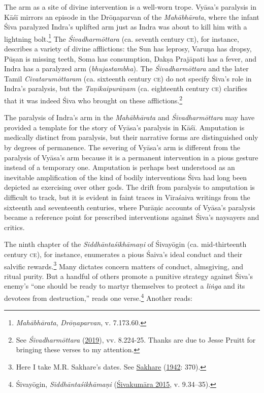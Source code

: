 The arm as a site of divine intervention is a well-worn trope. Vyāsa’s paralysis in Kāśī mirrors an episode in the Drōṇaparvan of the \emph{Mahābhārata}, where the infant Śiva paralyzed Indra’s uplifted arm just as Indra was about to kill him with a lightning bolt.\footnote{%
\emph{Mahābhārata}, \emph{Drōṇaparvan}, v. 7.173.60.
}
 The \emph{{Śivadharmōttara}} (ca. seventh century \textsc{ce}), for instance, describes a variety of divine afflictions: the Sun has leprosy, Varuṇa has dropsy, Pūṣan is missing teeth, Soma has consumption, Dakṣa Prajāpati has a fever, and Indra has a paralyzed arm (\emph{bhujastambha}). The \emph{{Śivadharmōttara}} and the later Tamil \emph{{Civatarumōttaram}} (ca. sixteenth century \textsc{ce}) do not specify Śiva’s role in Indra’s paralysis, but the \emph{{Taṇikaipurāṇam}} (ca. eighteenth century \textsc{ce}) clarifies that it was indeed Śiva who brought on these afflictions.\footnote{%
See \emph{{Śivadharmōttara}} (\hyperref[Sivadharmottara]{2019}), vv. 8.224-25. Thanks are due to Jesse Pruitt for bringing these verses to my attention.
}



The paralysis of Indra’s arm in the \emph{Mahābhārata} and \emph{{Śivadharmōttara}} may have provided a template for the story of Vyāsa’s paralysis in Kāśī. Amputation is medically distinct from paralysis, but their narrative forms are distinguished only by degrees of permanence. The severing of Vyāsa’s arm is different from the paralysis of Vyāsa’s arm because it is a permanent intervention in a pious gesture instead of a temporary one. Amputation is perhaps best understood as an inevitable amplification of the kind of bodily interventions Śiva had long been depicted as exercising over other gods. The drift from paralysis to amputation is difficult to track, but it is evident in faint traces in Vīraśaiva writings from the sixteenth and seventeenth centuries, where Purāṇic accounts of Vyāsa’s paralysis became a reference point for prescribed interventions against Śiva’s naysayers and critics.


The ninth chapter of the \emph{{Siddhāntaśikhāmaṇi}} of Śivayōgin (ca. mid-thirteenth century \textsc{ce}), for instance, enumerates a pious Śaiva’s ideal conduct and their salvific rewards.\footnote{%
Here I take M.\thinskip{}R. Sakhare’s dates. See \hyperref[Sakhare1942]{Sakhare} (\hyperref[Sakhare1942]{1942}: 370).
}
 Many dictates concern matters of conduct, almsgiving, and ritual purity. But a handful of others promote a punitive strategy against Śiva’s enemy’s  \Dash  “one should be ready to martyr themselves to protect a \emph{liṅga} and its devotees from destruction,” reads one verse.\footnote{%
Śivayōgin, \emph{{Siddhāntaśikhāmaṇi}} (\hyperref[Sivayogin2015]{Śivakumāra 2015}, v. 9.34–35).
}
 Another reads: 

